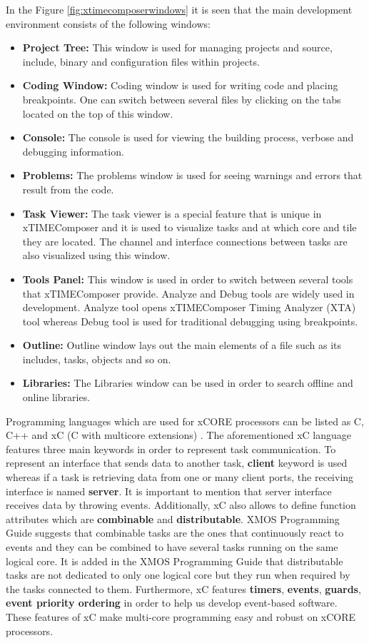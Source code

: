 In the Figure \ref{fig:xtimecomposerwindows} it is seen that the main development environment consists of the following windows:
\begin{itemize}
	\item \textbf{Project Tree:} This window is used for managing projects and source, include, binary and configuration files within projects.
	\item \textbf{Coding Window:} Coding window is used for writing code and placing breakpoints. One can switch between several files by clicking on the tabs located on the top of this window.
	\item \textbf{Console:} The console is used for viewing the building process, verbose and debugging information.
	\item \textbf{Problems:} The problems window is used for seeing warnings and errors that result from the code.
	\item \textbf{Task Viewer:} The task viewer is a special feature that is unique in xTIMEComposer and it is used to visualize tasks and at which core and tile they are located. The channel and interface connections between tasks are also visualized using this window.
	\item \textbf{Tools Panel:} This window is used in order to switch between several tools that xTIMEComposer provide. Analyze and Debug tools are widely used in development. Analyze tool opens xTIMEComposer Timing Analyzer (XTA) tool whereas Debug tool is used for traditional debugging using breakpoints.
	\item \textbf{Outline:} Outline window lays out the main elements of a file such as its includes, tasks, objects and so on.
	\item \textbf{Libraries:} The Libraries window can be used in order to search offline and online libraries.
\end{itemize}

Programming languages which are used for xCORE processors can be listed as C, C++ and xC (C with multicore extensions) \cite{xmosdatasheet}. The aforementioned xC language features three main keywords in order to represent task communication. To represent an interface that sends data to another task, \textbf{client} keyword is used whereas if a task is retrieving data from one or many client ports, the receiving interface is named \textbf{server}. It is important to mention that server interface receives data by throwing events. Additionally, xC also allows to define function attributes which are \textbf{combinable} and \textbf{distributable}. XMOS Programming Guide \cite{xmosprogrguide} suggests that combinable tasks are the ones that continuously react to events and they can be combined to have several tasks running on the same logical core. It is added in the XMOS Programming Guide \cite{xmosprogrguide} that distributable tasks are not dedicated to only one logical core but they run when required by the tasks connected to them. Furthermore, xC features \textbf{timers}, \textbf{events}, \textbf{guards}, \textbf{event priority ordering} in order to help us develop event-based software. These features of xC make multi-core programming easy and robust on xCORE processors.

